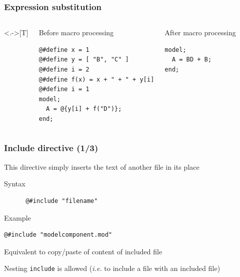 \documentclass[handout,usepdftitle=false,xcolor=dvipsnames,aspectratio=169]{beamer}
\begin{document}
\begin{frame}[fragile]
  \frametitle{Expression substitution}

  \begin{columns}<.->[T]

    \begin{block}{Before macro processing}
      \begin{verbatim}
@#define x = 1
@#define y = [ "B", "C" ]
@#define i = 2
@#define f(x) = x + " + " + y[i]
@#define i = 1
model;
  A = @{y[i] + f("D")};
end;
\end{verbatim}
    \end{block}


    \begin{block}{After macro processing}
      \begin{verbatim}
model;
  A = BD + B;
end;
\end{verbatim}
    \end{block}
  \end{columns}
\end{frame}

\begin{frame}[fragile]
  \frametitle{Include directive (1/3)}
  \begin{witemize}
    \item This directive simply inserts the text of another file in its place
    \begin{block}{Syntax}
      \begin{verbatim}
      @#include "filename"
    \end{verbatim}
    \end{block}
    \begin{block}{Example}
      \begin{verbatim}
@#include "modelcomponent.mod"
\end{verbatim}
    \end{block}
    \item Equivalent to copy/paste of content of included file
    \item Nesting \texttt{include} is allowed (\textit{i.e.} to include a
    file with an included file)
  \end{witemize}
\end{frame}
\end{document}
